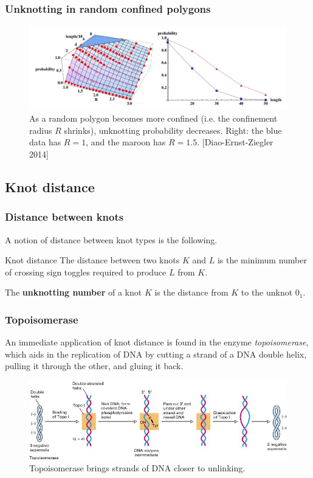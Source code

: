 \documentclass[presentation]{beamer}
\begin{document}
\begin{frame}
  \frametitle{Unknotting in random confined polygons}
  \begin{figure}
    \centering
    \includegraphics[width=.9\textwidth,keepaspectratio]{conf_kprobs.png}
    \caption{As a random polygon becomes more confined (i.e. the
      confinement radius $R$ shrinks), unknotting probability
      decreases. Right: the blue data has $R = 1$, and the maroon has
      $R = 1.5$. [Diao-Ernst-Ziegler 2014] }
    \label{fig:diaoconf}
  \end{figure}
\end{frame}

\subsection{Knot distance}

\begin{frame}
  \frametitle{Distance between knots}
  A notion of distance between knot types is the following.

  \begin{block}{Knot distance}
    The distance between two knots $K$ and $L$ is the minimum number
    of crossing sign toggles required to produce $L$ from $K$.
  \end{block}

  The \textbf{unknotting number} of a knot $K$ is the distance from
  $K$ to the unknot $0_1$.
\end{frame}

\begin{frame}
  \frametitle{Topoisomerase}
  An immediate application of knot distance is found in the enzyme
  \textit{topoisomerase}, which aids in the replication of DNA by cutting a
  strand of a DNA double helix, pulling it through the other, and gluing it back.
  \begin{figure}\centering
    \includegraphics[width=\textwidth,keepaspectratio]{topoisomerase.jpg}
    \caption{Topoisomerase brings strands of DNA closer to unlinking.}
    \label{fig:topoisomerase}
  \end{figure}

\end{frame}
\end{document}
